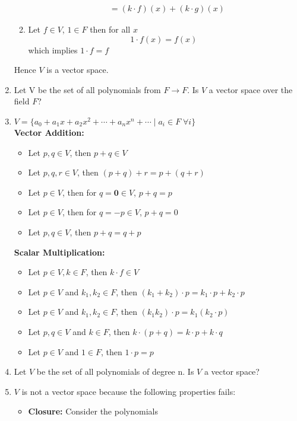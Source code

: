 \documentclass[a4paper, titlepage]{article}
\begin{document}
\begin{enumerate}[label=\textbf{\arabic*.}]
\begin{enumerate}[label=\textbf{\alph*}]
\begin{align*}
                                        &= (k\cdot f)(x) + (k\cdot g)(x)
            \end{align*}
            \item Let $f \in V$, $1 \in F$ then for all $x$ 
            $$ 1\cdot f(x) = f(x) $$
            which implies $1\cdot f = f$
        \end{enumerate}
        Hence $V$ is a vector space.
    \item Let V be the set of all polynomials from $F \rightarrow F$.
    Is $V$ a vector space over the field $F$?
    \item[] 
    $V = \{ a_0 + a_1x + a_2x^2 + \cdots + a_nx^n + \cdots \; | \; a_i \in F \; \forall i \} $ \hfill \\
    \textbf{Vector Addition: }
    \begin{itemize}
        \item Let $p, q \in V$, then $p + q \in V$
        \item Let $p, q, r \in V$, then $(p + q) + r = p + (q + r)$
        \item Let $ p \in V $, then for $q = \textbf{0} \in V$, $p + q = p$
        \item Let $ p \in V $, then for $q = -p \in V$, $p + q = 0$
        \item Let $p, q \in V$, then $p + q = q + p$
    \end{itemize}
    \textbf{Scalar Multiplication: }
    \begin{itemize}
        \item Let $p \in V, k \in F$, then $k\cdot f \in V$ 
        \item Let $p \in V$ and $k_ 1, k_2 \in F$, then $(k_1 + k_2)\cdot p = k_1\cdot p +  k_2\cdot p$
        \item Let $p \in V$ and $k_ 1, k_2 \in F$, then $(k_1k_2)\cdot p = k_1(k_2\cdot p)$
        \item Let $p, q \in V$ and $k \in F$, then $k\cdot (p + q) = k\cdot p +  k\cdot q$
        \item Let $p \in V$ and $1 \in F$, then $1\cdot p = p$
    \end{itemize}
    \item Let $V$ be the set of all polynomials of degree n. Is $V$ a vector space?
    \item[] $V$ is not a vector space because the following properties fails:
    \begin{itemize}
        \item \textbf{Closure: } Consider the polynomials 

\end{itemize}
\end{enumerate}
\end{document}
